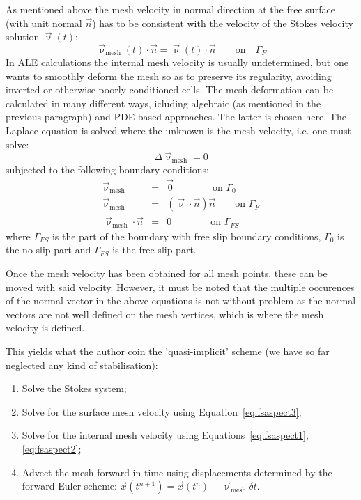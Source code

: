 As mentioned above the mesh velocity in normal direction at the free surface (with
unit normal $\vec{n}$) has to be consistent with the velocity of the Stokes
velocity solution $\vec{\upnu}(t)$:
\begin{equation}
\vec{\upnu}_{\text{mesh}}(t)\cdot \vec{n} = \vec{\upnu}(t)\cdot \vec{n} 
\qquad
\text{on}
\quad
\Gamma_F
\end{equation}
In ALE calculations the internal mesh velocity is usually undetermined, 
but one wants to smoothly deform the mesh so as to preserve its regularity, 
avoiding inverted or otherwise poorly conditioned cells. 
The mesh deformation can be calculated in many different ways, icluding algebraic 
(as mentioned in the previous paragraph) and PDE based approaches.
The latter is chosen here. 
The Laplace equation is solved where the unknown is the mesh velocity, i.e. 
one must solve:
\begin{equation}
\Delta \vec{\upnu}_{\text{mesh}} = 0\label{eq:fsaspect1}
\end{equation}
subjected to the following boundary conditions:
\begin{eqnarray}
\vec{\upnu}_{\text{mesh}} &=& \vec{0} \qquad\qquad \text{on } \Gamma_0 \\
\vec{\upnu}_{\text{mesh}} &=& (\vec{\upnu}\cdot\vec{n})\vec{n} \qquad \text{on } \Gamma_F \\
\vec{\upnu}_{\text{mesh}}\cdot \vec{n} &=& 0 \qquad\qquad \text{on } \Gamma_{FS} \label{eq:fsaspect2}
\end{eqnarray}
where $\Gamma_{FS}$ is the part of the boundary with free slip boundary conditions, 
$\Gamma_0$ is the no-slip part and $\Gamma_{FS}$ is the free slip part.

Once the mesh velocity has been obtained for all mesh points, these can be moved with 
said velocity. However, it must be noted that the multiple occurences of the normal vector
in the above equations is not without problem as the normal vectors are not well defined on the
mesh vertices, which is where the mesh velocity is defined.

This yields what the author coin the 'quasi-implicit' scheme 
(we have so far neglected any kind of stabilisation):
\begin{enumerate}
\item Solve the Stokes system;
\item Solve for the surface mesh velocity using Equation~\ref{eq:fsaspect3};
\item Solve for the internal mesh velocity using Equations~\ref{eq:fsaspect1}, \ref{eq:fsaspect2}; 
\item Advect the mesh forward in time using displacements determined by
the forward Euler scheme: $\vec{x}(t^{n+1} ) = \vec{x}(t^n ) + \vec{\upnu}_{\text{mesh}} \delta t$.
\end{enumerate}

